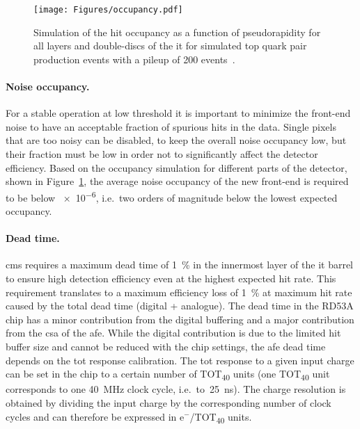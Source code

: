 \begin{figure}[b]
    \centering
    \texttt{[image: Figures/occupancy.pdf]}
    \caption{Simulation of the hit occupancy as a function of pseudorapidity for all layers and double-discs of the \gls{it} for simulated top quark pair production events with a pileup of 200 events~\citep{p2_tdr}.}
    \label{fig:occ}
\end{figure}

\paragraph{Noise occupancy.}
For a stable operation at low threshold it is important to minimize the front-end noise to have an acceptable fraction of spurious hits in the data. Single pixels that are too noisy can be disabled, to keep the overall noise occupancy low, but their fraction must be low in order not to significantly affect the detector efficiency.
Based on the occupancy simulation for different parts of the detector, shown in Figure~\ref{fig:occ}, the average noise occupancy of the new front-end is required to be below \num{e-6}, i.e.~two orders of magnitude below the lowest expected occupancy.




\paragraph{Dead time.} \gls{cms} requires a maximum dead time of \SI{1}{\percent} in the innermost layer of the \gls{it} barrel to ensure high detection efficiency even at the highest expected hit rate. This requirement translates to a maximum efficiency loss of \SI{1}{\percent} at maximum hit rate caused by the total dead time (digital + analogue). The dead time in the RD53A chip has a minor contribution from the digital buffering and a major contribution from the \gls{csa} of the \gls{afe}. While the digital contribution is due to the limited hit buffer size and cannot be reduced with the chip settings, the \gls{afe} dead time depends on the \gls{tot} response calibration. The \gls{tot} response to a given input charge can be set in the chip to a certain number of TOT\textsubscript{40} units (one TOT\textsubscript{40} unit corresponds to one \SI{40}{\mega\hertz} clock cycle, i.e.~to~\SI{25}{\nano\second}). The charge resolution is obtained by dividing the input charge by the corresponding number of clock cycles and can therefore be expressed in e${^{-}}$/TOT\textsubscript{40} units.

